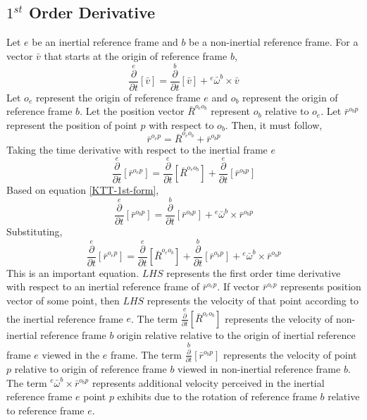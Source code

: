 \documentclass[class=report, 12pt, crop=false]{standalone}
\begin{document}
\begin{center}
\section{$1^{st}$ Order Derivative}
\begin{comment}
\end{comment}
Let $e$ be an inertial reference frame and  $b$ be a non-inertial reference frame. For a vector $\bar{v}$ that starts at the origin of reference frame $b$,
\begin{equation}
\overset{e}{\frac{\partial}{\partial t}}[\bar{v}] = \overset{b}{\frac{\partial}{\partial t}}[\bar{v}] + {}^{e}\bar{\omega}^{b}\times\bar{v}\label{KTT-1st-form}
\end{equation}
Let $o_{e}$ represent the origin of reference frame $e$ and $o_{b}$ represent the origin of reference frame $b$. Let the position vector $\bar{R}^{o_{e}o_{b}}$ represent $o_{b}$ relative to $o_{e}$. Let $\bar{r}^{o_{b}p}$ represent the position of point $p$ with respect to $o_{b}$. Then, it must follow,
$$\bar{r}^{o_{e}p} = \bar{R}^{o_{e}o_{b}} + \bar{r}^{o_{b}p}$$
Taking the time derivative with respect to the inertial frame $e$
$$\overset{e}{\frac{\partial}{\partial t}}[\bar{r}^{o_{e}p}] = \overset{e}{\frac{\partial}{\partial t}}[\bar{R}^{o_{e}o_{b}}] + \overset{e}{\frac{\partial}{\partial t}}[\bar{r}^{o_{b}p}]$$
Based on equation \ref{KTT-1st-form},
$$\overset{e}{\frac{\partial}{\partial t}}[\bar{r}^{o_{b}p}] = \overset{b}{\frac{\partial}{\partial t}}[\bar{r}^{o_{b}p}] + {}^{e}\bar{\omega}^{b}\times\bar{r}^{o_{b}p}$$
Substituting,
$$\overset{e}{\frac{\partial}{\partial t}}[\bar{r}^{o_{e}p}] = \overset{e}{\frac{\partial}{\partial t}}[\bar{R}^{o_{e}o_{b}}] + \overset{b}{\frac{\partial}{\partial t}}[\bar{r}^{o_{b}p}] + {}^{e}\bar{\omega}^{b}\times\bar{r}^{o_{b}p}$$
This is an important equation. $LHS$ represents the first order time derivative with respect to an inertial reference frame of $\displaystyle \bar{r}^{o_{e}p}$. If vector $\displaystyle \bar{r}^{o_{e}p}$ represents position vector of some point, then $LHS$ represents the velocity of that point according to the inertial reference frame $e$. The term $\displaystyle \overset{e}{\frac{\partial}{\partial t}}[\bar{R}^{o_{e}o_{b}}]$ represents the velocity of non-inertial reference frame $b$ origin relative relative to the origin of inertial reference frame $e$ viewed in the $e$ frame. The term $\displaystyle \overset{b}{\frac{\partial}{\partial t}}[\bar{r}^{o_{b}p}]$ represents the velocity of point $p$ relative to origin of reference frame $b$ viewed in non-inertial reference frame $b$. The term $\displaystyle {}^{e}\bar{\omega}^{b}\times\bar{r}^{o_{b}p}$ represents additional velocity perceived in the inertial reference frame $e$ point $p$ exhibits due to the rotation of reference frame $b$ relative to reference frame $e$.

\end{center}
\end{document}
